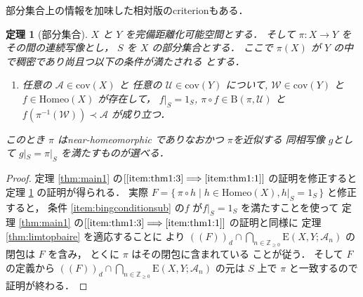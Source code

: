 \documentclass[leqno, a4paper, 12pt]{jsarticle}
\numberwithin{equation}{section}
\newtheorem{thm}{定理}
\newcommand{\To}{\Longrightarrow}
\newcommand{\zz}{\mathbb{Z}}
\newcommand{\yocov}[1]{\mathrm{cov}(#1)}
\newcommand{\yocovfont}[1]{\mathscr{#1}}
\newcommand{\yofine}{\prec}
\newcommand{\yonbset}[2]{\mathrm{B}(#1, #2)}
\newcommand{\yocmaps}[3]{\mathrm{E}(#1, #2; #3)}
\newcommand{\yomaphset}[1]{\mathrm{Homeo}(#1)}
\newcommand{\yometcl}[2]{(\!(#1)\!)_{#2}}
\begin{document}
部分集合上の情報を加味した相対版のcriterionもある．
\begin{thm}[部分集合]\label{thm:mainsub1}
$X$
と
$Y$
を完備距離化可能空間とする．
そして
$\pi \colon X\to Y$
をその間の連続写像とし，
$S$
を
$X$
の部分集合とする．
ここで
$\pi(X)$
が
$Y$
の中で稠密であり尚且つ以下の条件が満たされる
とする．
\begin{enumerate}[label=\textup{(Bing-sub)}, leftmargin=*]
\item\label{item:bingconditionsub}
任意の
$\yocovfont{A}\in \yocov{X}$
と
任意の
$\yocovfont{U}\in \yocov{Y}$
について, 
$\yocovfont{W}\in \yocov{Y}$
と
$f\in \yomaphset{X}$
が存在して，
$f|_{S}=1_{S}$, 
$\pi\circ f\in \yonbset{\pi}{\yocovfont{U}}$
と
$f(\pi^{-1}(\yocovfont{W}))\yofine \yocovfont{A}$
が成り立つ．
\end{enumerate}
このとき
$\pi$
はnear-homeomorphic 
でありなおかつ
$\pi$を近似する
同相写像
$g$として
$g|_{S}=\pi|_{S}$
を満たすものが選べる．
\end{thm}
\begin{proof}
定理
\ref{thm:main1}
の$[\ref{item:thm1:3}\To \ref{item:thm1:1}]$
の証明を修正すると
定理
\ref{thm:mainsub1}
の証明が得られる．
実際
$F=\{\, \pi\circ h\mid h\in \yomaphset{X}, h|_{S}=1_{S}\, \}$
と修正すると，
条件
\ref{item:bingconditionsub}
の$f$
が$f|_{S}=1_{S}$
を満たすことを使って
定理
\ref{thm:main1}
の$[\ref{item:thm1:3}\To \ref{item:thm1:1}]$
の証明と同様に
定理\ref{thm:limtopbaire}
を適応することに
より
$\yometcl{F}{d}\cap \bigcap_{n\in \zz_{\ge 0}}\yocmaps{X}{Y}{\yocovfont{A}_{n}}$
の閉包は
$F$
を含み，
とくに
$\pi$
はその閉包に含まれている
ことが従う．
そして
$F$
の定義から
$\yometcl{F}{d}\cap \bigcap_{n\in \zz_{\ge 0}}\yocmaps{X}{Y}{\yocovfont{A}_{n}}$
の元は
$S$
上で
$\pi$
と一致するので証明が終わる．
\end{proof}
\end{document}
